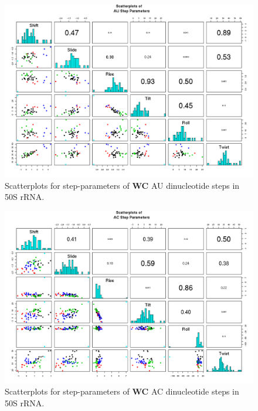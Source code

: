 \begin{figure}[H]
\centering
\includegraphics[angle=90, scale=0.6]{WC/AU.png}
\caption{Scatterplots for step-parameters of \textbf{WC} AU dinucleotide steps
in 50S rRNA.}
\label{fig:stepsAU}
\end{figure}

\begin{figure}[H]
\centering
\includegraphics[angle=90, scale=0.6]{WC/AC.png}
\caption{Scatterplots for step-parameters of \textbf{WC} AC dinucleotide steps
in 50S rRNA.}
\label{fig:stepsAC}
\end{figure}

